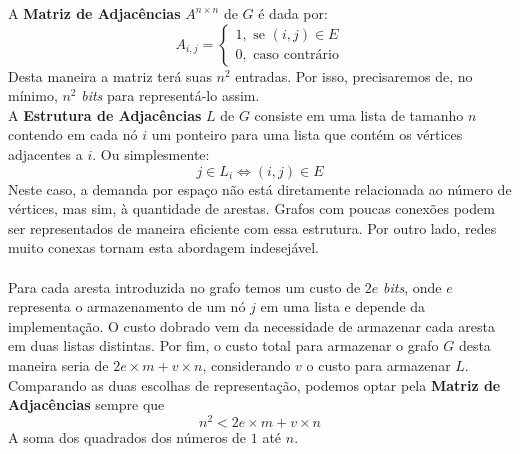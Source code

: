 \documentclass{homework}
\begin{document}
	\subsubquest A \textbf{Matriz de Adjacências} $A^{n \times n}$ de $G$ é dada por:
		\[A_{i,j} = \begin{cases}
			1, \text{ se } (i, j) \in E\\
			0, \text{ caso contrário}
		\end{cases}\]
	Desta maneira a matriz terá suas $n^2$ entradas. Por isso, precisaremos de, no mínimo, $n^2$ \emph{bits} para representá-lo assim.\\
	
	\subsubquest A \textbf{Estrutura de Adjacências} $L$ de $G$ consiste em uma lista de tamanho $n$ contendo em cada nó $i$ um ponteiro para uma lista que contém os vértices adjacentes a $i$. Ou simplesmente:
		$$j \in L_i \iff (i, j) \in E$$
	Neste caso, a demanda por espaço não está diretamente relacionada ao número de vértices, mas sim, à quantidade de arestas. Grafos com poucas conexões podem ser representados de maneira eficiente com essa estrutura. Por outro lado, redes muito conexas tornam esta abordagem indesejável.\\
	\\
	Para cada aresta introduzida no grafo temos um custo de $2e$ \emph{bits}, onde $e$ representa o armazenamento de um nó $j$ em uma lista e depende da implementação. O custo dobrado vem da necessidade de armazenar cada aresta em duas listas distintas. Por fim, o custo total para armazenar o grafo $G$ desta maneira seria de $2e \times m + v \times n$, considerando $v$ o custo para armazenar $L$.\\
	
	\subsubquest Comparando as duas escolhas de representação, podemos optar pela \textbf{Matriz de Adjacências} sempre que
		$$n^2 < 2e \times m + v \times n$$
	\quest
	\quest
	\quest
	\quest
	\quest
	\subsubquest A soma dos quadrados dos números de $1$ até $n$.
	
\end{document}

